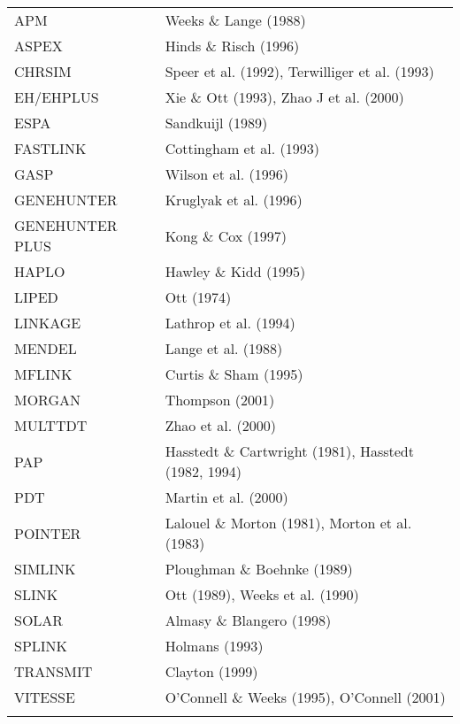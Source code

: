 \documentclass[11pt,a4paper]{iopthsis}
\begin{document}
\begin{tabular}{ll}
\\
APM & Weeks \& Lange (1988)\\
ASPEX & Hinds \& Risch (1996)\\
CHRSIM & Speer et al. (1992), Terwilliger et al. (1993)\\
EH/EHPLUS & Xie \& Ott (1993), Zhao J et al. (2000)\\
ESPA & Sandkuijl (1989)\\
FASTLINK & Cottingham et al. (1993)\\
GASP & Wilson et al. (1996)\\
GENEHUNTER & Kruglyak et al. (1996)\\
GENEHUNTER PLUS & Kong \& Cox (1997)\\
HAPLO & Hawley \& Kidd (1995)\\
LIPED & Ott (1974)\\
LINKAGE & Lathrop et al. (1994)\\
MENDEL & Lange et al. (1988) \\
MFLINK & Curtis \& Sham (1995)\\
MORGAN & Thompson (2001) \\
MULTTDT & Zhao et al. (2000)\\
PAP & Hasstedt \& Cartwright (1981), Hasstedt (1982, 1994)\\
PDT & Martin et al. (2000) \\
POINTER & Lalouel \& Morton (1981), Morton et al. (1983)\\
SIMLINK & Ploughman \& Boehnke (1989)\\
SLINK & Ott (1989), Weeks et al. (1990)\\
SOLAR & Almasy \& Blangero (1998)\\
SPLINK & Holmans (1993)\\
TRANSMIT & Clayton (1999)\\
VITESSE & O'Connell \& Weeks (1995), O'Connell (2001)\\
\\
\end{tabular}
\newpage
\setcounter{page}{0}
\end{document}
